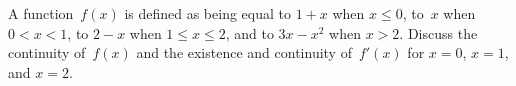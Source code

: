 A function~$f(x)$ is defined as being equal to $1 + x$ when $x \leq 0$, to~$x$ when
$0 < x < 1$, to $2 - x$ when $1 \leq x \leq 2$, and to $3x - x^{2}$ when $x > 2$. Discuss the
continuity of~$f(x)$ and the existence and continuity of~$f'(x)$ for $x = 0$, $x = 1$,
and $x = 2$. 

